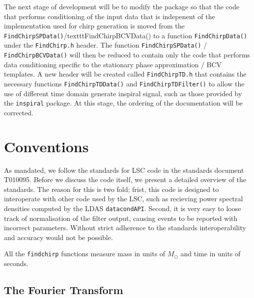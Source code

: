 The next stage of development will be to modify the package so that the code
that performs conditioning of the input data that is indepenent of the
implementation used for chirp generation is moved from the
\texttt{FindChirpSPData()}/texttt{FindChirpBCVData()} 
 to a function \texttt{FindChirpData()} under the
\texttt{FindChirp.h} header. The function \texttt{FindChirpSPData()} 
/ \texttt{FindChirpBCVData()} will then
be reduced to contain only the code that performs data conditioning specific
to the stationary phase approximation / BCV templates. A new header will be 
created called
\texttt{FindChirpTD.h} that contains the necessary functions
\texttt{FindChirpTDData()} and \texttt{FindChirpTDFilter()} to allow the use
of different time domain generate inspiral signal, such as those provided by
the \texttt{inspiral} package. At this stage, the ordering of the
documentation will be corrected.
\newpage

\section{Conventions}

As mandated, we follow the standards for LSC code in the standards
document T010095. Before we discuss the code itself, we present a detailed
overview of the standards. The reason for this is two fold; frist, this code is
designed to interoperate with other code used by the LSC, such as recieving
power spectral densities computed by the LDAS \texttt{datacondAPI}. Second, it
is very easy to loose track of normalisation of the filter output, causing
events to be reported with incorrect parameters. Without strict adherence to
the standards interoperability and accuracy would not be possible.

All the \texttt{findchirp} functions measure mass in units of $M_\odot$ 
and time in units of seconds.

\subsection{The Fourier Transform}

